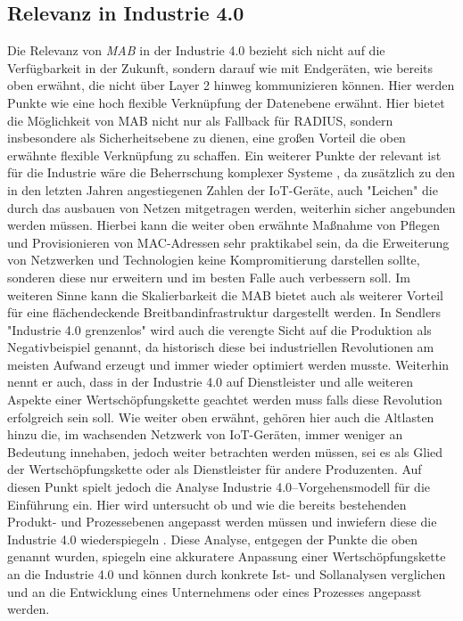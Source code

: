 \documentclass[conference]{IEEEtran}
\begin{document}
\subsection{Relevanz in Industrie 4.0}
Die Relevanz von \emph{MAB} in der Industrie 4.0 bezieht sich nicht auf die Verfügbarkeit in der Zukunft, sondern darauf wie mit Endgeräten, wie bereits oben erwähnt, die nicht über Layer 2 hinweg kommunizieren können. Hier werden Punkte wie  eine hoch flexible Verknüpfung der Datenebene \cite{hirsch2014wandel} erwähnt. Hier bietet die Möglichkeit von MAB nicht nur als Fallback für RADIUS, sondern insbesondere als Sicherheitsebene zu dienen, eine großen Vorteil die oben erwähnte flexible Verknüpfung zu schaffen. Ein weiterer Punkte der relevant ist für die Industrie wäre die Beherrschung komplexer Systeme \cite{botthof2015zukunft}, da zusätzlich zu den in den letzten Jahren angestiegenen Zahlen der IoT-Geräte, auch "Leichen" die durch das ausbauen von Netzen mitgetragen werden, weiterhin sicher angebunden werden müssen. Hierbei kann die weiter oben erwähnte Maßnahme von Pflegen und Provisionieren von MAC-Adressen sehr praktikabel sein, da die Erweiterung von Netzwerken und Technologien keine Kompromitierung darstellen sollte, sonderen diese nur erweitern und im besten Falle auch verbessern soll. Im weiteren Sinne kann die Skalierbarkeit die MAB bietet auch als weiterer Vorteil für eine flächendeckende Breitbandinfrastruktur \cite{botthof2015zukunft} dargestellt werden. In  Sendlers "Industrie 4.0 grenzenlos" wird auch die verengte Sicht auf die Produktion als Negativbeispiel genannt\cite{sendler2016industrie}, da historisch diese bei industriellen Revolutionen am meisten Aufwand erzeugt und immer wieder optimiert werden musste. Weiterhin nennt er auch, dass in der Industrie 4.0 auf Dienstleister und alle weiteren Aspekte einer Wertschöpfungskette geachtet werden muss falls diese Revolution erfolgreich sein soll. Wie weiter oben erwähnt, gehören hier auch die Altlasten hinzu die, im wachsenden Netzwerk von IoT-Geräten, immer weniger an Bedeutung innehaben, jedoch weiter betrachten werden müssen, sei es als Glied der Wertschöpfungskette oder als Dienstleister für andere Produzenten. Auf diesen Punkt spielt jedoch die Analyse Industrie 4.0–Vorgehensmodell für die Einführung ein. Hier wird untersucht ob und wie die bereits bestehenden Produkt- und Prozessebenen angepasst werden müssen und inwiefern diese die Industrie 4.0 wiederspiegeln \cite{lucia2016industrie}. Diese Analyse, entgegen der Punkte die oben genannt wurden, spiegeln eine akkuratere Anpassung einer Wertschöpfungskette an die Industrie 4.0 und können durch konkrete Ist- und Sollanalysen verglichen und an die Entwicklung eines Unternehmens oder eines Prozesses angepasst werden.
\end{document}
